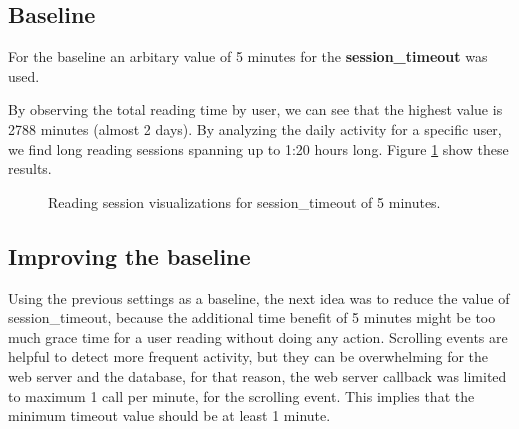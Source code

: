 \subsection{Baseline}
For the baseline an arbitary value of 5 minutes for the \textbf{session\_timeout} was used.

By observing the total reading time by user, we can see that the highest value is 2788 minutes (almost 2 days). By analyzing the daily activity for a specific user, we find long reading sessions spanning up to 1:20 hours long. Figure \ref{fig:visualizations_1st_iteration} show these results.

\begin{figure}[bth]
	\myfloatalign
	 \quad 
	 \quad
	\caption{Reading session visualizations for session\_timeout of 5 minutes.}\label{fig:visualizations_1st_iteration}
\end{figure}


\subsection{Improving the baseline}
Using the previous settings as a baseline, the next idea was to reduce the value of session\_timeout, because the additional time benefit of 5 minutes might be too much grace time for a user reading without doing any action. Scrolling events are helpful to detect more frequent activity, but they can be overwhelming for the web server and the database, for that reason, the web server callback was limited to maximum 1 call per minute, for the scrolling event. This implies that the minimum timeout value should be at least 1 minute.

